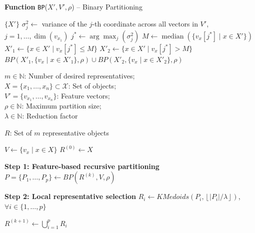 \documentclass{ieeeaccess}
\newcommand{\representativeamount}{m}
\newcommand{\maxpartitionsize}{\rho}
\newcommand{\reductionfactor}{\lambda}
\newcommand{\kmedoidsalg}{KMedoids\xspace}
\newcommand{\partitioning}{FP\xspace}
\begin{document}
\begin{algorithm}[t]
\caption{Feature-based Partitioning algorithm (\partitioning)}
\label{alg:partitioning}
\begin{algorithmic}[1]

\STATE \textbf{Function} \texttt{BP}($X', V', \maxpartitionsize$) -- Binary Partitioning
\begin{ALC@g}
\IF{$|X'| \leq \maxpartitionsize$}
    \RETURN $\{X'\}$
\ELSE
    \STATE $\sigma^2_j \gets$ variance of the $j$-th coordinate
    across all vectors in $V'$, $j=1,\dots,\dim(v_{x_1})$
    \STATE $j^* \gets \arg\max_j(\sigma^2_j)$
    \STATE $M \gets \operatorname{median}
    (\{v_x[j^*] \mid x\in X'\})$
    \STATE $X'_1 \gets \{x\in X' \mid v_x[j^*]\leq M\}$
    \STATE $X'_2 \gets \{x\in X' \mid v_x[j^*]>M\}$
    \RETURN
    $BP(X'_1,\{v_x\mid x\in X'_1\},\maxpartitionsize)
    \cup
    BP(X'_2,\{v_x\mid x\in X'_2\},\maxpartitionsize)$
\ENDIF
\end{ALC@g}\vspace{\baselineskip}


\REQUIRE
$\representativeamount \in \mathbb{N}$: Number of desired representatives; \\
$X =\{x_1,\dots,x_n\} \subset \mathcal{X}$: Set of objects; \\
$V'=\{v_{x_1},\dots,v_{x_n}\}$: Feature vectors;\\
$\maxpartitionsize \in \mathbb{N}$: Maximum partition size; \\
$\reductionfactor \in \mathbb{N}$: Reduction factor\vspace{\baselineskip}

\ENSURE
$R$: Set of $\representativeamount$ representative objects\vspace{\baselineskip}

\STATE $V \gets \{v_x \mid x\in X\}$
\STATE $R^{(0)} \gets X$

\WHILE{$|R^{(k)}| > \representativeamount$}

    \STATE \textbf{Step 1: Feature-based recursive partitioning}
    \STATE $P=\{P_1,\dots,P_p\}
    \gets BP(R^{(k)},V,\maxpartitionsize)$

    \STATE \textbf{Step 2: Local representative selection}
    \STATE $R_i \gets
    \kmedoidsalg\left(P_i,
    \left\lfloor |P_i|/\reductionfactor\right\rfloor\right)$,
    $\forall i\in\{1,\dots,p\}$

    \STATE $R^{(k+1)}\gets
    \bigcup_{i=1}^{p}R_i$

\ENDWHILE

\end{algorithmic}
\end{algorithm}
\end{document}
